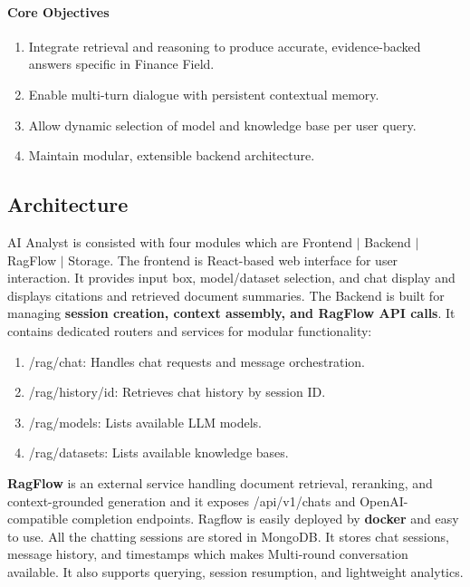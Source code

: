 \paragraph{\textbf{Core Objectives}}

\begin{enumerate}
	\item Integrate retrieval and reasoning to produce accurate, evidence-backed answers specific in Finance Field.
	\item Enable multi-turn dialogue with persistent contextual memory.
	\item Allow dynamic selection of model and knowledge base per user query.
	\item Maintain modular, extensible backend architecture.
\end{enumerate}

\subsection{Architecture}

AI Analyst is consisted with four modules which are Frontend $|$ Backend $|$ RagFlow $|$ Storage. The frontend is React-based web interface for user interaction. It provides input box, model/dataset selection, and chat display and displays citations and retrieved document summaries. The Backend is built for managing \textbf{session creation, context assembly, and RagFlow API calls}. It contains dedicated routers and services for modular functionality:
\begin{enumerate}
	\item /rag/chat: Handles chat requests and message orchestration.
	\item /rag/history/{id}: Retrieves chat history by session ID.
	\item /rag/models: Lists available LLM models.
	\item /rag/datasets: Lists available knowledge bases.
\end{enumerate}



\textbf{RagFlow} is an external service handling document retrieval, reranking, and context-grounded generation and it exposes /api/v1/chats and OpenAI-compatible completion endpoints. Ragflow is easily deployed by \textbf{docker} and easy to use. All the chatting sessions are stored in MongoDB. It stores chat sessions, message history, and timestamps which makes Multi-round conversation available. It also supports querying, session resumption, and lightweight analytics.

